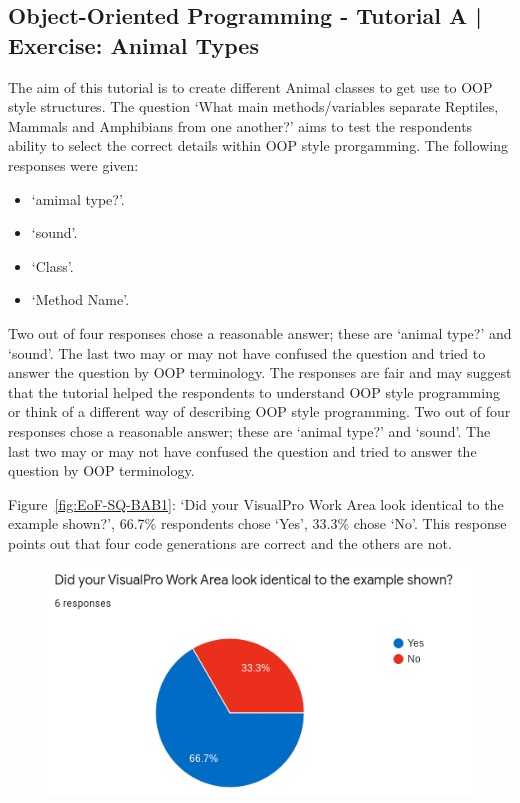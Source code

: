 \documentclass[12pt]{report} %
\begin{document}
			\subsection{Object-Oriented Programming - Tutorial A | Exercise: Animal Types}
			The aim of this tutorial is to create different Animal classes to get use to OOP style structures. The question `What main methods/variables separate Reptiles, Mammals and Amphibians from one another?' aims to test the respondents ability to select the correct details within OOP style prorgamming. The following responses were given:
			\begin{itemize}
				\item `amimal type?'.
				\item `sound'.
				\item `Class'.
				\item `Method Name'.
			\end{itemize}

			Two out of four responses chose a reasonable answer; these are `animal type?' and `sound'. The last two may or may not have confused the question and tried to answer the question by OOP terminology. The responses are fair and may suggest that the tutorial helped the respondents to understand OOP style programming or think of a different way of describing OOP style programming. Two out of four responses chose a reasonable answer; these are `animal type?' and `sound'. The last two may or may not have confused the question and tried to answer the question by OOP terminology.

			Figure~\ref{fig:EoF-SQ-BAB1}: `Did your VisualPro Work Area look identical to the example shown?', 66.7\% respondents chose `Yes', 33.3\% chose `No'. This response points out that four code generations are correct and the others are not.

			\begin{figure}
				{\includegraphics[scale=0.50]{Figures/VisualPro-Survey_Results/SQ-BAB1.png}}
			\end{figure}
\end{document}
